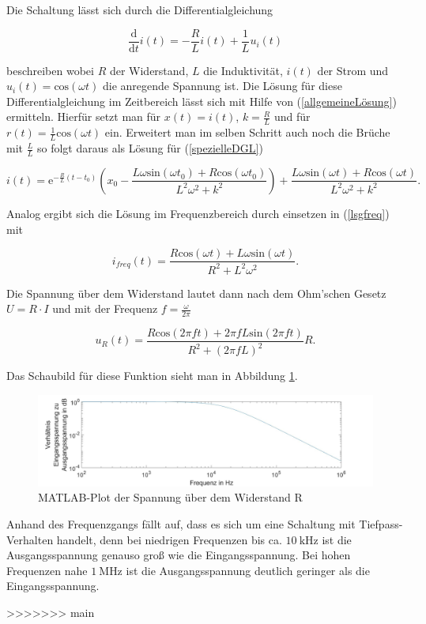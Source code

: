 Die Schaltung lässt sich durch die Differentialgleichung

\begin{equation}
	\frac{\mathrm{d}}{\mathrm{d}t}i(t) = -\frac{R}{L}i(t) +\frac{1}{L}u_i(t)
	\label{spezielleDGL}
\end{equation}

beschreiben wobei $R$ der Widerstand, $L$ die Induktivität, $i(t)$ der Strom und $u_i(t)=\mathrm{cos}(\omega t)$ die anregende Spannung ist. Die Lösung für diese Differentialgleichung im Zeitbereich lässt sich mit Hilfe von (\ref{allgemeineLösung}) ermitteln. Hierfür setzt man für $x(t) = i(t)$, $k=\frac{R}{L}$ und für $r(t) = \frac{1}{L}\mathrm{cos}(\omega t)$ ein. Erweitert man im selben Schritt auch noch die Brüche mit $\frac{L}{L}$ so folgt daraus als Lösung für (\ref{spezielleDGL})

\begin{equation*}
	i(t) = \mathrm{e}^{-\frac{R}{L}(t-t_0)}\left(x_0-\frac{L\omega \mathrm{sin}(\omega t_0)+R\mathrm{cos}(\omega t_0)}{L^2\omega^2+k^2}\right)+\frac{L\omega \mathrm{sin}(\omega t)+R\mathrm{cos}(\omega t)}{L^2\omega^2+k^2}.
\end{equation*}

Analog ergibt sich die Lösung im Frequenzbereich durch einsetzen in (\ref{lsgfreq}) mit

\begin{equation*}
	i_{freq} (t) = \frac{R\mathrm{cos}(\omega t) + L\omega\mathrm{sin}(\omega t)}{R^2+ L^2\omega^2}.
\end{equation*}

Die Spannung über dem Widerstand lautet dann nach dem Ohm'schen Gesetz $U=R\cdot I$ und mit der Frequenz $f=\frac{\omega}{2\pi}$

\begin{equation*}
u_{R} (t) = \frac{R\mathrm{cos}(2\pi ft) + 2\pi fL\mathrm{sin}(2\pi ft)}{R^2+ (2\pi fL)^2}R.
\end{equation*}

Das Schaubild für diese Funktion sieht man in Abbildung \ref{spannungplot}.

\begin{figure}[h]
	\includegraphics[width=\textwidth]{data/nocheinversuch.jpg}
	\caption{MATLAB-Plot der Spannung über dem Widerstand R}
	\label{spannungplot}
\end{figure}

Anhand des Frequenzgangs fällt auf, dass es sich um eine Schaltung mit Tiefpass-Verhalten handelt, denn bei niedrigen Frequenzen bis ca. $\SI{10}{\kilo\hertz}$ ist die Ausgangsspannung genauso groß wie die Eingangsspannung. Bei hohen Frequenzen nahe $\SI{1}{\mega \hertz}$ ist die Ausgangsspannung deutlich geringer als die Eingangsspannung.




>>>>>>> main
